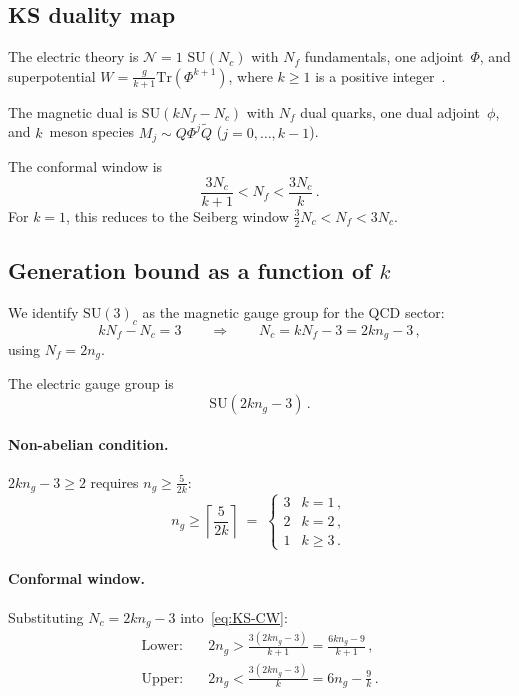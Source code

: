 \documentclass[11pt,a4paper]{article}
\theoremstyle{plain}
\theoremstyle{definition}
\theoremstyle{remark}
\newcommand{\Nc}{N_{\!c}}
\newcommand{\Nf}{N_{\!f}}
\newcommand{\ngen}{n_g}
\newcommand{\SU}[1]{\mathrm{SU}(#1)}
\newcommand{\Tr}{\mathrm{Tr}}
\begin{document}
\subsection{KS duality map}

The electric theory is $\mathcal{N}=1$ $\SU{\Nc}$ with $\Nf$
fundamentals, one adjoint~$\Phi$, and superpotential
$W = \frac{g}{k+1}\Tr(\Phi^{k+1})$, where $k \geq 1$ is a positive
integer~\cite{KS9505004,KSS9507040}.

The magnetic dual is $\SU{k\Nf - \Nc}$ with $\Nf$ dual quarks, one
dual adjoint~$\phi$, and $k$~meson species $M_j \sim Q\Phi^j
\widetilde{Q}$ ($j = 0, \ldots, k-1$).

The conformal window is~\cite{KS9505004}
\begin{equation}\label{eq:KS-CW}
  \frac{3\Nc}{k+1} < \Nf < \frac{3\Nc}{k}\,.
\end{equation}
For $k = 1$, this reduces to the Seiberg window
$\frac{3}{2}\Nc < \Nf < 3\Nc$.

\subsection{Generation bound as a function of $k$}

We identify $\SU{3}_c$ as the magnetic gauge group for the QCD sector:
\begin{equation}
  k\Nf - \Nc = 3
  \qquad\Longrightarrow\qquad
  \Nc = k\Nf - 3 = 2k\ngen - 3\,,
\end{equation}
using $\Nf = 2\ngen$.

The electric gauge group is
\begin{equation}\label{eq:KS-electric}
  \SU{2k\ngen - 3}\,.
\end{equation}

\paragraph{Non-abelian condition.}
$2k\ngen - 3 \geq 2$ requires $\ngen \geq \frac{5}{2k}$:
\begin{equation}\label{eq:KS-bound}
  \ngen \geq \left\lceil \frac{5}{2k} \right\rceil
  \;=\; \begin{cases}
    3 & k = 1\,, \\
    2 & k = 2\,, \\
    1 & k \geq 3\,.
  \end{cases}
\end{equation}

\paragraph{Conformal window.}
Substituting $\Nc = 2k\ngen - 3$ into~\eqref{eq:KS-CW}:
\begin{align}
  \text{Lower:}&\quad 2\ngen > \frac{3(2k\ngen - 3)}{k+1}
  = \frac{6k\ngen - 9}{k+1}\,,
  \label{eq:KS-lower} \\
  \text{Upper:}&\quad 2\ngen < \frac{3(2k\ngen - 3)}{k}
  = 6\ngen - \frac{9}{k}\,.
  \label{eq:KS-upper}
\end{align}
\end{document}
